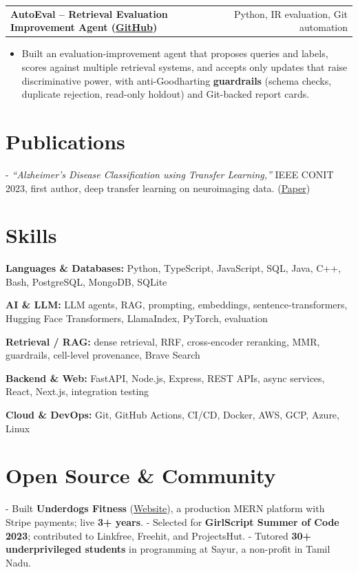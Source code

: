 \documentclass[letterpaper,11pt]{article}
\makeatletter
\newcommand{\projItem}[2]{%
  \vspace{2pt}
  \begin{tabular*}{\textwidth}{@{}l@{\extracolsep{\fill}}r@{}}
    \textbf{#1} & #2 \\
  \end{tabular*}\par\vspace{-3pt}
}
\newcommand{\skillLine}[2]{\textbf{#1:} #2\par\vspace{1.5pt}}
\newcommand{\inlineBlock}[1]{{\setlength{\leftskip}{0.18in}\small #1\par}}
\makeatother
\begin{document}
\projItem{AutoEval -- Retrieval Evaluation Improvement Agent {\normalfont\small(\href{https://github.com/Deva-1903/AutoEval}{GitHub})}}{Python, IR evaluation, Git automation}
\begin{itemize}
  \item Built an evaluation-improvement agent that proposes queries and labels, scores against multiple retrieval systems, and accepts only updates that raise discriminative power, with anti-Goodharting \textbf{guardrails} (schema checks, duplicate rejection, read-only holdout) and Git-backed report cards.
\end{itemize}

\section{Publications}
\vspace{2pt}
\inlineBlock{- \textit{``Alzheimer's Disease Classification using Transfer Learning,''} IEEE CONIT 2023, first author, deep transfer learning on neuroimaging data. {\normalfont\small(\href{https://ieeexplore.ieee.org/document/10205760}{Paper})}}

\section{Skills}
\skillLine{Languages \& Databases}{Python, TypeScript, JavaScript, SQL, Java, C++, Bash, PostgreSQL, MongoDB, SQLite}
\skillLine{AI \& LLM}{LLM agents, RAG, prompting, embeddings, sentence-transformers, Hugging Face Transformers, LlamaIndex, PyTorch, evaluation}
\skillLine{Retrieval / RAG}{dense retrieval, RRF, cross-encoder reranking, MMR, guardrails, cell-level provenance, Brave Search}
\skillLine{Backend \& Web}{FastAPI, Node.js, Express, REST APIs, async services, React, Next.js, integration testing}
\skillLine{Cloud \& DevOps}{Git, GitHub Actions, CI/CD, Docker, AWS, GCP, Azure, Linux}

\section{Open Source \& Community}
\inlineBlock{- Built \textbf{Underdogs Fitness} (\href{https://www.underdogsfitness.in/}{Website}), a production MERN platform with Stripe payments; live \textbf{3+ years}. - Selected for \textbf{GirlScript Summer of Code 2023}; contributed to Linkfree, Freehit, and ProjectsHut. - Tutored \textbf{30+ underprivileged students} in programming at Sayur, a non-profit in Tamil Nadu.}
\end{document}
